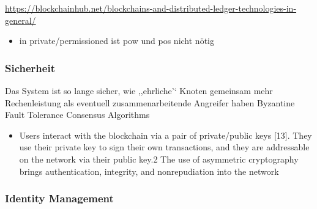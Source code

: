         
        \sloppy\url{https://blockchainhub.net/blockchains-and-distributed-ledger-technologies-in-general/}
        \begin{itemize}[noitemsep]
            \item in private/\-permissioned ist \gls{pow} und \gls{pos} nicht nötig
        \end{itemize}
    
    \subsubsection{Sicherheit}
    \label{sec:sota_blockchain_security}
        Das System ist so lange sicher, wie ,,ehrliche'` Knoten gemeinsam mehr Rechenleistung als eventuell zusammenarbeitende Angreifer haben\cite{Nakamoto2008}
        Byzantine Fault Tolerance
        Consensus Algorithms
        \begin{itemize}
            \item Users interact with the blockchain via a pair of private/public keys [13]. They use their private key to sign their own transactions, and they are addressable on the network via their public key.2 The use of asymmetric cryptography brings authentication, integrity, and nonrepudiation into the network\cite{Christidis2016}
        \end{itemize}
    
    \subsubsection{Identity Management}
    \label{sec:sota_blockchain_identitymgmnt}
